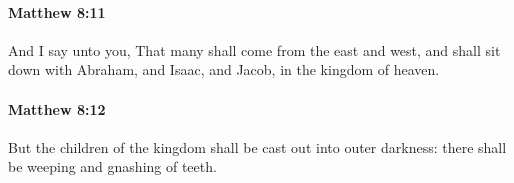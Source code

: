 		\paragraph{Matthew 8:11} %
			\label{MATTHEW-8-11}

			And I say unto you, That many shall come from the east and west, and shall sit down with Abraham, and Isaac, and Jacob, in the kingdom of heaven.

			\begin{framed}
			\scriptsize
				\begin{compactdesc}
					\item[SBLG] 
				\end{compactdesc}
			\end{framed}

		\paragraph{Matthew 8:12} %
			\label{MATTHEW-8-12}

			But the children of the kingdom shall be cast out into outer darkness: there shall be weeping and gnashing of teeth.

